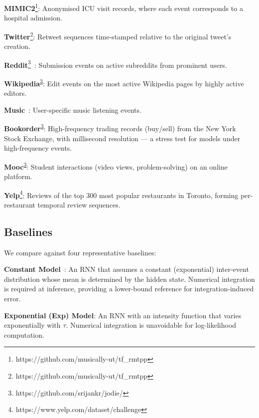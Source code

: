 \noindent\textbf{MIMIC2}\footnote{https://github.com/musically-ut/tf\_rmtpp}:
Anonymised ICU visit records, where each event corresponds to a hospital admission.

\noindent\textbf{Twitter}\footnote{https://github.com/musically-ut/tf\_rmtpp}:
Retweet sequences time-stamped relative to the original tweet's creation.

\noindent\textbf{Reddit}\footnote{\label{fn:jodie}https://github.com/srijankr/jodie/}~\cite{kumar2019predicting,shchur2019intensity}:
Submission events on active subreddits from prominent users.

\noindent\textbf{Wikipedia}\textsuperscript{\ref{fn:jodie}}:
Edit events on the most active Wikipedia pages by highly active editors.

\noindent\textbf{Music}~\cite{celma2010music}:
User-specific music listening events.

\noindent\textbf{Bookorder}\textsuperscript{\ref{fn:jodie}}:
High-frequency trading records (buy/sell) from the New York Stock Exchange,
with millisecond resolution — a stress test for models under high-frequency events.

\noindent\textbf{Mooc}\textsuperscript{\ref{fn:jodie}}:
Student interactions (video views, problem-solving) on an online platform.

\noindent\textbf{Yelp}\footnote{https://www.yelp.com/dataset/challenge}:
Reviews of the top 300 most popular restaurants in Toronto, forming
per-restaurant temporal review sequences.

\subsection{Baselines}

We compare against four representative baselines:

\noindent\textbf{Constant Model}~\cite{sill1997monotonic,omi2019fully}:
An RNN that assumes a constant (exponential) inter-event distribution
whose mean is determined by the hidden state.
Numerical integration is required at inference, providing a lower-bound
reference for integration-induced error.

\noindent\textbf{Exponential (Exp) Model}:
An RNN with an intensity function that varies exponentially with $\tau$.
Numerical integration is unavoidable for log-likelihood computation.

